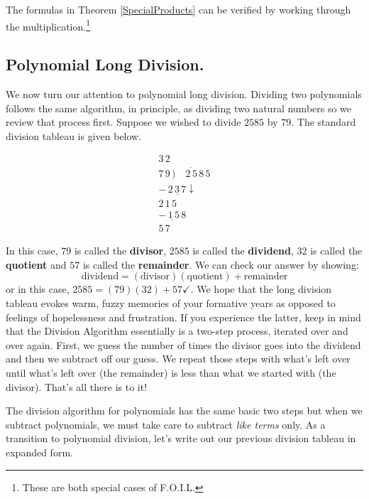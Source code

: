 \documentclass{ximera}
\begin{document}

 

The formulas in Theorem \ref{SpecialProducts} can be verified by working through the multiplication.\footnote{These are both special cases of F.O.I.L.}

\subsection{Polynomial Long Division.}
\label{polylongdiv}

We now turn our attention to polynomial long division.  Dividing two polynomials follows the same algorithm, in principle, as dividing two natural numbers so we review that process first.  Suppose we wished to divide $2585$ by $79$.  The standard division tableau is given below.

\[
\begin{array}{r}
 3 \, 2 \\
 7 \, 9 \, \overline{)\quad 2\,5\,8\,5 } \\
 \underline{-\,2\,3\,7\downarrow}  \\
 2\,1\,5 \\
 \underline{-\,1\,5\,8} \\
 5\,7
\end{array}
\]

In this case, $79$ is called the \textbf{divisor}, $2585$ is called the \textbf{dividend}, $32$ is called the \textbf{quotient} and $57$ is called the \textbf{remainder}.  We can check our answer by showing:  \[ \text{dividend} = (\text{divisor})( \text{quotient}) + \text{remainder}\] or in this case, $2585 = 
 (79)(32) + 57 \checkmark$.  We hope that the long division tableau evokes warm, fuzzy memories of your formative years as opposed to feelings of hopelessness and frustration.  If you experience the latter, keep in mind that the Division Algorithm essentially is a two-step process, iterated over and over again.  First, we guess the number of times the divisor goes into the dividend and  then we subtract off our guess.  We repeat those steps with what's left over until what's left over (the remainder) is less than what we started with (the divisor).  That's all there is to it!

 

The division algorithm for polynomials has the same basic two steps but when we subtract polynomials, we must take care to subtract \emph{like terms} only.  As a transition to polynomial division, let's write out our previous division tableau in expanded form.
\end{document}
